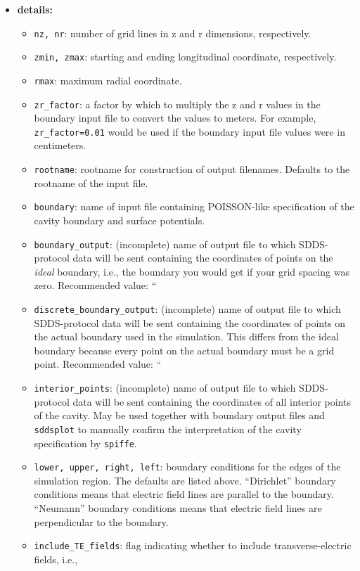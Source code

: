 \begin{itemize}
\item {\bf details:}
\begin{itemize}
\item {\tt nz, nr}: number of grid lines in z and r dimensions, respectively.
\item {\tt zmin, zmax}: starting and ending longitudinal coordinate, respectively.
\item {\tt rmax}: maximum radial coordinate.
\item {\tt zr\_factor}: a factor by which to multiply the z and r values in the boundary
 input file to convert the values to meters.  For example, {\tt zr\_factor=0.01} would be used if the 
 boundary input file values were in centimeters.
\item {\tt rootname}: rootname for construction of output filenames.  Defaults to the rootname of
 the input file.
\item {\tt boundary}: name of input file containing POISSON-like specification of the cavity boundary
        and surface potentials.
\item {\tt boundary\_output}: (incomplete) name of output file to which SDDS-protocol data will be sent containing
        the coordinates of points on the {\em ideal} boundary, i.e., the boundary you would get if
        your grid spacing was zero.  Recommended value: ``%
\item {\tt discrete\_boundary\_output}: (incomplete) name of output
        file to which SDDS-protocol data will be sent containing the
        coordinates of points on the actual boundary used in the
        simulation.  This differs from the ideal boundary because
        every point on the actual boundary must be a grid point.
        Recommended value: ``%
\item {\tt interior\_points}: (incomplete) name of output file to which SDDS-protocol data will be sent containing 
        the coordinates of all interior points of the cavity.  May be used together with boundary
        output files and {\tt sddsplot} to manually confirm the interpretation of the cavity
        specification by {\tt spiffe}.
\item {\tt lower, upper, right, left}: boundary conditions for the edges of the simulation region.
        The defaults are listed above.  ``Dirichlet'' boundary conditions means that electric field
        lines are parallel to the boundary.  ``Neumann'' boundary conditions means that electric field
        lines are perpendicular to the boundary.
\item {\tt include\_TE\_fields}: flag indicating whether to include transverse-electric fields, i.e.,

\end{itemize}
\end{itemize}
